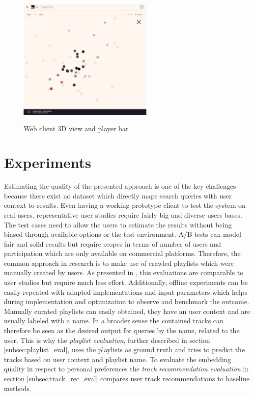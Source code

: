 \documentclass[sigconf]{acmart}
\begin{document}
\begin{figure}[ht]
	{\includegraphics[width=250px]{web_client_3d.png}}	
	\caption{Web client 3D view and player bar}
	\label{fig:web_client_3d}
\end{figure}

\section{Experiments}
Estimating the quality of the presented approach is one of the key challenges because there exist no dataset which directly maps search queries with user context to results. Even having a working prototype client to test the system on real users, representative user studies require fairly big and diverse users bases. The test cases need to allow the users to estimate the results without being biased through available options or the test environment. A/B tests can model fair and solid results but require scopes in terms of number of users and participation which are only available on commercial platforms. Therefore, the common approach in research is to make use of crawled playlists which were manually created by users. As presented in \cite{kamehkhosh2017user}, this evaluations are comparable to user studies but require much less effort. Additionally, offline experiments can be easily repeated with adapted implementations and input parameters which helps during implementation and optimization to observe and benchmark the outcome. \\

Manually curated playlists can easily obtained, they have an user context and are usually labeled with a name. In a broader sense the contained tracks can therefore be seen as the desired output for queries by the name, related to the user. This is why the \emph{playlist evaluation}, further described in section \ref{subsec:playlist_eval}, uses the playlists as ground truth and tries to predict the tracks based on user context and playlist name. To evaluate the embedding quality in respect to personal preferences the \emph{track recommendation evaluation} in section \ref{subsec:track_rec_eval} compares user track recommendations to baseline methods.
\end{document}
